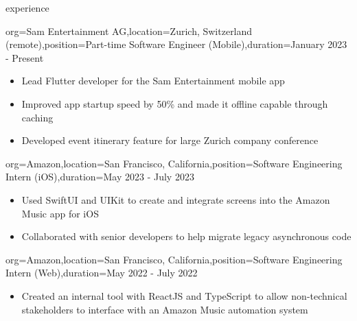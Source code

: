 \documentclass{resume}
\begin{document}
%
\pagebreak
\makeheader

\newcommand{\skill}[2]{\textbf{#1} - #2}


\begin{ResumeSection}{experience}
    \begin{ResumeSubsection}{org={Sam Entertainment AG},location={Zurich,
        Switzerland (remote)},position={Part-time Software Engineer (Mobile)},duration={January
    2023 - Present}}
        \begin{itemize}
            \item Lead Flutter developer for the Sam Entertainment mobile app
            \item Improved app startup speed by 50\% and made it offline capable
                through caching
            \item Developed event itinerary feature for large Zurich company
                conference
        \end{itemize}
    \end{ResumeSubsection}

    \begin{ResumeSubsection}{org={Amazon},location={San Francisco,
        California},position={Software Engineering Intern (iOS)},duration={May 2023 -
    July 2023}}
        \begin{itemize}
            \item Used SwiftUI and UIKit to create and integrate screens into
                the Amazon Music app for iOS
            \item Collaborated with senior developers to help migrate legacy asynchronous code
        \end{itemize}
    \end{ResumeSubsection}
    \begin{ResumeSubsection}{org={Amazon},location={San Francisco,
        California},position={Software Engineering Intern (Web)},duration={May 2022 - July 2022}}
        \begin{itemize}
            \item Created an internal tool with ReactJS and TypeScript to allow
                non-technical stakeholders to interface with an Amazon Music automation
                system
        \end{itemize}
    \end{ResumeSubsection}



\end{ResumeSection}
\end{document}
